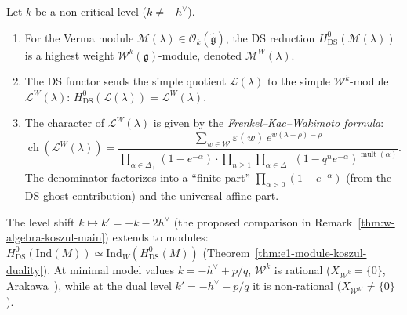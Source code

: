 \begin{proposition}
\label{prop:w-module-structure}
Let $k$ be a non-critical level ($k \neq -h^\vee$).
\begin{enumerate}[label=\textup{(\roman*)}]
\item For the Verma module $\mathcal{M}(\lambda) \in
  \mathcal{O}_k(\widehat{\mathfrak{g}})$, the DS reduction
  $H^0_{\mathrm{DS}}(\mathcal{M}(\lambda))$ is a highest weight
  $\mathcal{W}^k(\mathfrak{g})$-module, denoted
  $\mathcal{M}^W(\lambda)$.
\item The DS functor sends the simple quotient
  $\mathcal{L}(\lambda)$ to the simple
  $\mathcal{W}^k$-module $\mathcal{L}^W(\lambda)$:
  $H^0_{\mathrm{DS}}(\mathcal{L}(\lambda)) = \mathcal{L}^W(\lambda)$.
\item The character of $\mathcal{L}^W(\lambda)$ is given by the
  \emph{Frenkel--Kac--Wakimoto formula}:
  \begin{equation}\label{eq:w-character}
  \operatorname{ch}(\mathcal{L}^W(\lambda))
  = \frac{\sum_{w \in \mathcal{W}} \varepsilon(w)\,
     e^{w(\lambda + \rho) - \rho}}
    {\prod_{\alpha \in \Delta_+}(1 - e^{-\alpha})
     \cdot \prod_{n \geq 1} \prod_{\alpha \in \Delta_+}
     (1 - q^n e^{-\alpha})^{\operatorname{mult}(\alpha)}}.
  \end{equation}
  The denominator factorizes into a ``finite part''
  $\prod_{\alpha > 0}(1 - e^{-\alpha})$ (from the DS ghost
  contribution) and the universal affine part.
\end{enumerate}
\end{proposition}

\begin{remark}
\label{rem:w-module-koszul}
The level shift $k \mapsto k' = -k - 2h^\vee$ (the proposed comparison in Remark~\ref{thm:w-algebra-koszul-main}) extends to modules: $H^0_{\mathrm{DS}}(\mathrm{Ind}(M)) \simeq \mathrm{Ind}_W(H^0_{\mathrm{DS}}(M))$ (Theorem~\ref{thm:e1-module-koszul-duality}).  At minimal model values $k = -h^\vee + p/q$, $\mathcal{W}^k$ is rational ($X_{\mathcal{W}^k} = \{0\}$, Arakawa~\cite{Arakawa17}), while at the dual level $k' = -h^\vee - p/q$ it is non-rational ($X_{\mathcal{W}^{k'}} \neq \{0\}$).
\end{remark}

